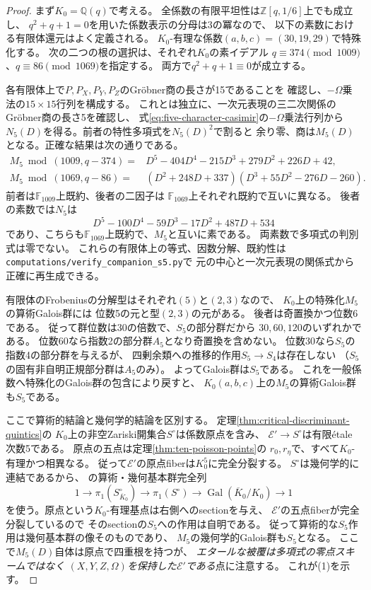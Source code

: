 \begin{proof}
まず$K_0=\mathbb Q(q)$で考える。
全係数の有限平坦性は$\mathbb Z[q,1/6]$上でも成立し、
$q^2+q+1=0$を用いた係数表示の分母は$3$の冪なので、
以下の素数における有限体還元はよく定義される。
$K_0$-有理な係数$(a,b,c)=(30,19,29)$で特殊化する。
次の二つの根の選択は、それぞれ$K_0$の素イデアル
$q\equiv374\pmod{1009}$、$q\equiv86\pmod{1069}$を指定する。
両方で$q^2+q+1\equiv0$が成立する。

各有限体上で$P,P_X,P_Y,P_Z$のGr\"obner商の長さが15であることを
確認し、$-\Omega$乗法の$15\times15$行列を構成する。
これとは独立に、一次元表現の三二次関係のGr\"obner商の長さ5を確認し、
式\eqref{eq:five-character-casimir}の$-\Omega$乗法行列から
$N_5(D)$を得る。前者の特性多項式を$N_5(D)^2$で割ると
余り零、商は$M_5(D)$となる。正確な結果は次の通りである。
\begin{align*}
 M_5\bmod(1009,q-374)
  ={}&D^5-404D^4-215D^3+279D^2+226D+42,\\
 M_5\bmod(1069,q-86)
  ={}&(D^2+248D+337)(D^3+55D^2-276D-260).
\end{align*}
前者は$\mathbb F_{1009}$上既約、後者の二因子は
$\mathbb F_{1069}$上それぞれ既約で互いに異なる。
後者の素数では$N_5$は
\[
 D^5-100D^4-59D^3-17D^2+487D+534
\]
であり、こちらも$\mathbb F_{1069}$上既約で、$M_5$と互いに素である。
両素数で多項式の判別式は零でない。
これらの有限体上の等式、因数分解、既約性は
\texttt{computations/verify\_companion\_s5.py}で
元の中心と一次元表現の関係式から正確に再生成できる。

有限体のFrobeniusの分解型はそれぞれ$(5)$と$(2,3)$なので、
$K_0$上の特殊化$M_5$の算術Galois群には
位数5の元と型$(2,3)$の元がある。
後者は奇置換かつ位数6である。
従って群位数は$30$の倍数で、$S_5$の部分群だから
$30,60,120$のいずれかである。
位数60なら指数2の部分群$A_5$となり奇置換を含めない。
位数30なら$S_5$の指数4の部分群を与えるが、
四剰余類への推移的作用$S_5\to S_4$は存在しない
（$S_5$の固有非自明正規部分群は$A_5$のみ）。
よってGalois群は$S_5$である。
これを一般係数へ特殊化のGalois群の包含により戻すと、
$K_0(a,b,c)$上の$M_5$の算術Galois群も$S_5$である。

ここで算術的結論と幾何学的結論を区別する。
定理\ref{thm:critical-discriminant-quintics}の
$K_0$上の非空Zariski開集合$S^\circ$は係数原点を含み、
$\mathcal E'\to S^\circ$は有限\'{e}tale次数5である。
原点の五点は定理\ref{thm:ten-poisson-points}の
$r_0,r_\eta$で、すべて$K_0$-有理かつ相異なる。
従って$\mathcal E'$の原点fiberは$K_0^5$に完全分裂する。
$S^\circ$は幾何学的に連結であるから、\cite[Lemma 58.14.3]{StacksPi1}
の算術・幾何基本群完全列
\[
 1\longrightarrow\pi_1(S^\circ_{\overline K_0})
 \longrightarrow\pi_1(S^\circ)
 \longrightarrow\operatorname{Gal}(\overline K_0/K_0)\longrightarrow1
\]
を使う。原点という$K_0$-有理基点は右側へのsectionを与え、
$\mathcal E'$の五点fiberが完全分裂しているので
そのsectionの$S_5$への作用は自明である。
従って算術的な$S_5$作用は幾何基本群の像そのものであり、
$M_5$の幾何学的Galois群も$S_5$となる。
ここで$M_5(D)$自体は原点で四重根を持つが、
\emph{エタールな被覆は多項式の零点スキームではなく
$(X,Y,Z,\Omega)$を保持した$\mathcal E'$である}点に注意する。
これが(1)を示す。


\end{proof}
